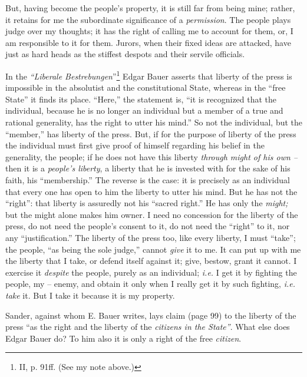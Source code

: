 But, having become the people's property, it is still far from being mine; 
rather, it retains for me the subordinate significance of a 
\textit{permission}. The people plays judge over my thoughts; it has the right 
of calling me to account for them, or, I am responsible to it for them. 
Jurors, when their fixed ideas are attacked, have just as hard heads as the 
stiffest despots and their servile officials.

In the \textit{``Liberale Bestrebungen}''\footnote{II, p. 91ff. (See my note 
above.)} Edgar Bauer asserts that liberty of the press is impossible in the 
absolutist and the constitutional State, whereas in the ``free State'' it 
finds its place. ``Here,'' the statement is, ``it is recognized that the 
individual, because he is no longer an individual but a member of a true and 
rational generality, has the right to utter his mind.'' So not the 
individual, but the ``member,'' has liberty of the press. But, if for the 
purpose of liberty of the press the individual must first give proof of 
himself regarding his belief in the generality, the people; if he does not 
have this liberty \textit{through might of his own --} then it is a 
\textit{people's liberty}, a liberty that he is invested with for the sake of 
his faith, his ``membership.'' The reverse is the case: it is precisely as 
an individual that every one has open to him the liberty to utter his mind. 
But he has not the ``right'': that liberty is assuredly not his ``sacred 
right.'' He has only the \textit{might;} but the might alone makes him owner. 
I need no concession for the liberty of the press, do not need the people's 
consent to it, do not need the ``right'' to it, nor any ``justification.'' 
The liberty of the press too, like every liberty, I must ``take''; the 
people, ``as being the sole judge,'' cannot \textit{give} it to me. It can 
put up with me the liberty that I take, or defend itself against it; give, 
bestow, grant it cannot. I exercise it \textit{despite} the people, purely as 
an individual; \textit{i.e.} I get it by fighting the people, my -- enemy, and 
obtain it only when I really get it by such fighting, \textit{i.e. take} it. 
But I take it because it is my property.

Sander, against whom E. Bauer writes, lays claim (page 99) to the liberty of 
the press ``as the right and the liberty of the \textit{citizens in the 
State''}. What else does Edgar Bauer do? To him also it is only a right of 
the free \textit{citizen}.

